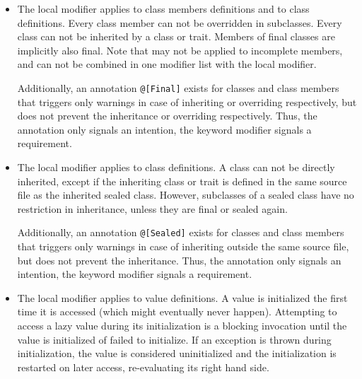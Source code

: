 \begin{itemize}
\item
The  local modifier applies to class members definitions and to class definitions. Every  class member can not be overridden in subclasses. Every  class can not be inherited by a class or trait. Members of final classes are implicitly also final. Note that  may not be applied to incomplete members, and can not be combined in one modifier list with the  local modifier. 

Additionally, an annotation \lstinline!@[Final]! exists for classes and class members that triggers only warnings in case of inheriting or overriding respectively, but does not prevent the inheritance or overriding respectively. Thus, the annotation only signals an intention, the keyword modifier signals a requirement. 

\item
The  local modifier applies to class definitions. A  class can not be directly inherited, except if the inheriting class or trait is defined in the same source file as the inherited sealed class. However, subclasses of a sealed class have no restriction in inheritance, unless they are final or sealed again. 

Additionally, an annotation \lstinline!@[Sealed]! exists for classes and class members that triggers only warnings in case of inheriting outside the same source file, but does not prevent the inheritance. Thus, the annotation only signals an intention, the keyword modifier signals a requirement. 

\item
The  local modifier applies to value definitions. A  value is initialized the first time it is accessed (which might eventually never happen). Attempting to access a lazy value during its initialization is a blocking invocation until the value is initialized of failed to initialize. If an exception is thrown during initialization, the value is considered uninitialized and the initialization is restarted on later access, re-evaluating its right hand side. 


\end{itemize}
